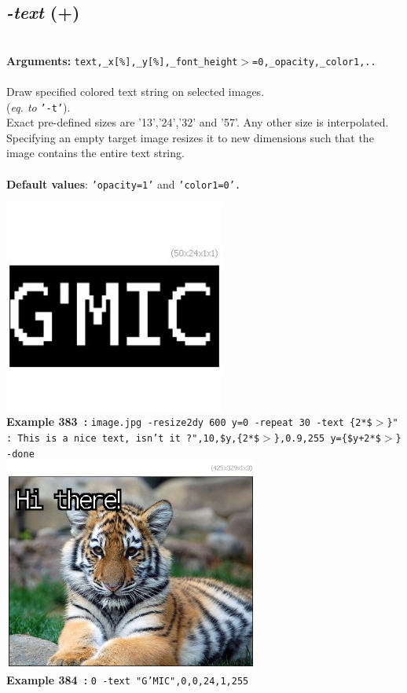 \documentclass[a4paper,11pt,twoside]{book}
\begin{document}
\subsection{\emph{-text} (+)}\vspace*{-0.5em}
~\\\textbf{Arguments: } 
{\small \texttt{text,\_x[\%],\_y[\%],\_font\_height$>$=0,\_opacity,\_color1,..}}\\~\\
Draw specified colored text string on selected images.
~\\(\emph{eq. to} {\small \texttt{'-t'}}).
~\\Exact pre-defined sizes are '13','24','32' and '57'. Any other size is interpolated.
~\\Specifying an empty target image resizes it to new dimensions such that the image contains
the entire text string.
~\\~\\\textbf{Default values}: {\small \texttt{'opacity=1'} and \texttt{'color1=0'.}}
\begin{center}\includegraphics[keepaspectratio=true,height=7cm,width=\textwidth]{img/gmic_def383.jpg}\\
{\footnotesize \textbf{Example 383~:} \texttt{image.jpg -resize2dy 600 y=0 -repeat 30 -text \{2*\$$>$\}" : This is a nice text, isn't it ?",10,\$y,\{2*\$$>$\},0.9,255 y=\{\$y+2*\$$>$\} -done}}
\\\includegraphics[keepaspectratio=true,height=7cm,width=\textwidth]{img/gmic_def384.jpg}\\
{\footnotesize \textbf{Example 384~:} \texttt{0 -text "G'MIC",0,0,24,1,255}}
\end{center}
\end{document}
